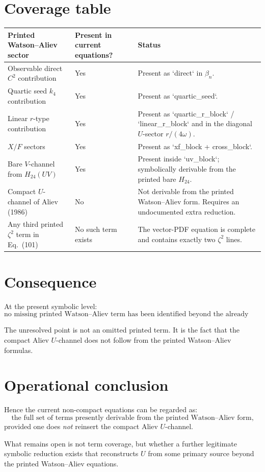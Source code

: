\documentclass[11pt]{article}
\begin{document}
\section*{Coverage table}

\begin{center}
\begin{tabular}{>{\raggedright\arraybackslash}p{4.2cm} >{\raggedright\arraybackslash}p{3.0cm} >{\raggedright\arraybackslash}p{6.9cm}}
\toprule
Printed Watson--Aliev sector & Present in current equations? & Status \\
\midrule
Observable direct \(C^2\) contribution & Yes & Present as `direct` in \(\beta_n\). \\
Quartic seed \(k_4\) contribution & Yes & Present as `quartic_seed`. \\
Linear \(r\)-type contribution & Yes & Present as `quartic_r_block` / `linear_r_block` and in the diagonal \(U\)-sector \(r/(4\omega)\). \\
\(X/F\) sectors & Yes & Present as `xf_block + cross_block`. \\
Bare \(V\)-channel from \(H_{24}(UV)\) & Yes & Present inside `uv_block`; symbolically derivable from the printed bare \(H_{24}\). \\
Compact \(U\)-channel of Aliev (1986) & No & Not derivable from the printed Watson--Aliev form. Requires an undocumented extra reduction. \\
Any third printed \(\zeta^2\) term in Eq.~(101) & No such term exists & The vector-PDF equation is complete and contains exactly two \(\zeta^2\) lines. \\
\bottomrule
\end{tabular}
\end{center}

\section*{Consequence}

At the present symbolic level:
\[
\boxed{
\text{no missing printed Watson--Aliev term has been identified beyond the already implemented sectors.}
}
\]

The unresolved point is not an omitted printed term. It is the fact that the compact Aliev \(U\)-channel does not follow from the printed Watson--Aliev formulas.

\section*{Operational conclusion}

Hence the current non-compact equations can be regarded as:
\[
\boxed{
\text{the full set of terms presently derivable from the printed Watson--Aliev form,}
}
\]
provided one does \emph{not} reinsert the compact Aliev \(U\)-channel.

What remains open is not term coverage, but whether a further legitimate symbolic reduction exists that reconstructs \(U\) from some primary source beyond the printed Watson--Aliev equations.
\end{document}
